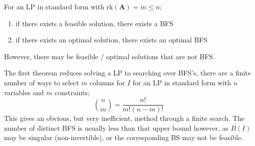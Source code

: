 \documentclass[a4paper, 12pt]{article}
\newcommand{\mat}[1]{\boldsymbol{#1}}
\begin{document}
            For an LP in standard form with $\text{rk}(\mat{A}) = m \leq n$;
            \begin{enumerate}[1.]
                \itemsep0em
                \item if there exists a feasible solution, there exists a BFS
                \item if there exists an optimal solution, there exists an optimal BFS
            \end{enumerate}
            However, there may be feasible / optimal solutions that are not BFS.
            \medskip

            The first theorem reduces solving a LP to searching over BFS's, there are a finite number of ways to select $m$ columns for $I$ for an LP in standard form with $n$ variables and $m$ constraints;
            $$\binom{n}{m} = \frac{n!}{m! (n - m)!}$$
            This gives an obvious, but very inefficient, method through a finite search.
            The number of distinct BFS is usually less than that upper bound however, as $B(I)$ may be singular (non-invertible), or the corresponding BS may not be feasible.
\end{document}
